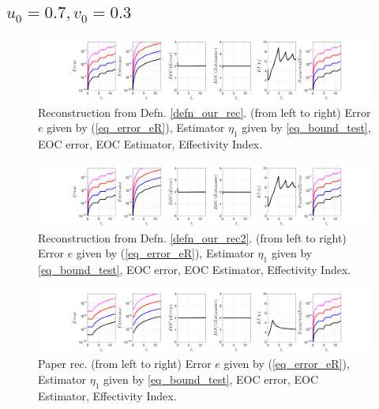 \documentclass[12pt,a4paper]{article}
\numberwithin{equation}{section}
\theoremstyle{definition}
\begin{document}
\subsection*{$u_0=0.7, v_0= 0.3$}
\begin{figure}[H]
	\hspace{-3cm}
	\includegraphics[scale=0.55]{fig_LeapFrogplots_1x5_sin_IC_harmonic_order_2_u7_v3_rec_george}	
	\caption{Reconstruction from Defn. \ref{defn_our_rec}. (from left to right) Error $e$ given by (\ref{eq_error_eR}), Estimator $\eta_1$ given by \ref{eq_bound_test},   EOC error, EOC Estimator, Effectivity Index.}
	\label{fig_all_in_one_our_rec_george_u7_v3}
\end{figure}
\begin{figure}[H]
	\hspace{-3cm}
	\includegraphics[scale=0.55]{fig_LeapFrogplots_1x5_sin_IC_harmonic_order_2_u7_v3_rec2}	
	\caption{Reconstruction from Defn. \ref{defn_our_rec2}. (from left to right) Error $e$ given by (\ref{eq_error_eR}), Estimator $\eta_1$ given by \ref{eq_bound_test},   EOC error, EOC Estimator, Effectivity Index.}
	\label{fig_all_in_one_our_rec_2_u7_v3}
\end{figure}
\begin{figure}[H]
	\hspace{-3cm}
	\includegraphics[scale=0.55]{fig_LeapFrogplots_1x5_sin_IC_harmonic_u7_v3_paperrec}	
	\caption{Paper rec. (from left to right) Error $e$ given by (\ref{eq_error_eR}), Estimator $\eta_1$ given by \ref{eq_bound_test},   EOC error, EOC Estimator, Effectivity Index.}
	\label{fig_all_in_one_paperrec_u07_v03}
\end{figure}
\end{document}
